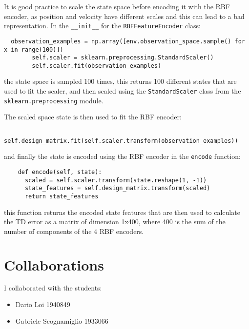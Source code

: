 \documentclass{article}
\begin{document}
It is good practice to scale the state space before encoding it with the RBF encoder,
as position and velocity have different scales and this can lead to a bad representation.
In the \texttt{\_\_init\_\_} for the \texttt{RBFFeatureEncoder} class:
\begin{verbatim}
  observation_examples = np.array([env.observation_space.sample() for x in range(100)])
        self.scaler = sklearn.preprocessing.StandardScaler()
        self.scaler.fit(observation_examples)
\end{verbatim}

the state space is sampled 100 times, this returns 100 different states that are used to fit the scaler,
and then scaled using the \texttt{StandardScaler} class from the \texttt{sklearn.preprocessing} module.

The scaled space state is then used to fit the RBF encoder:

\begin{verbatim}
    self.design_matrix.fit(self.scaler.transform(observation_examples))
\end{verbatim}

and finally the state is encoded using the RBF encoder in the \texttt{encode} function:

\begin{verbatim}
    def encode(self, state):
      scaled = self.scaler.transform(state.reshape(1, -1))
      state_features = self.design_matrix.transform(scaled)
      return state_features
\end{verbatim}

this function returns the encoded state features that are then used to calculate the TD error as a matrix
of dimension 1x400, where 400 is the sum of the number of components of the 4 RBF encoders.

\section{Collaborations}
I collaborated with the students:
\begin{itemize}
  \item Dario Loi 1940849
  \item Gabriele Scognamiglio 1933066
\end{itemize}
\end{document}
